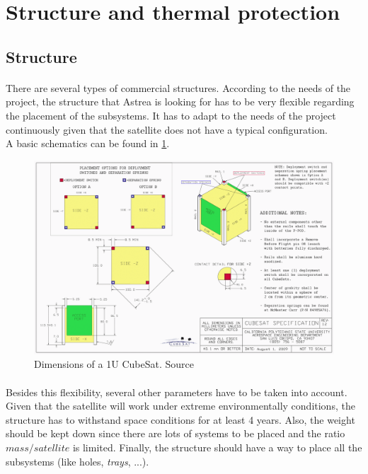 \section{Structure and thermal protection}
\subsection{Structure}
\paragraph{}There are several types of commercial structures. According to the needs of the project, the structure that Astrea is looking for has to be very flexible regarding the placement of the subsystems. It has to adapt to the needs of the project continuously given that the satellite does not have a typical configuration.\\
A basic schematics can be found in \ref{epsschematics}.

\begin{figure}[h!]
\includegraphics[scale=0.6]{./sections/SatelliteDept/sections/images/CubeSatDesign}
\centering
\caption{Dimensions of a 1U CubeSat. Source \cite{cubesatdimensions}}
\label{epsschematics}
\end{figure}

\paragraph{}Besides this flexibility, several other parameters have to be taken into account. Given that the satellite will work under extreme environmentally conditions, the structure has to withstand space conditions for at least 4 years. Also, the weight should be kept down since there are lots of systems to be placed and the ratio $ mass / satellite $ is limited. Finally, the structure should have a way to place all the subsystems (like holes, \textit{trays}, ...).

